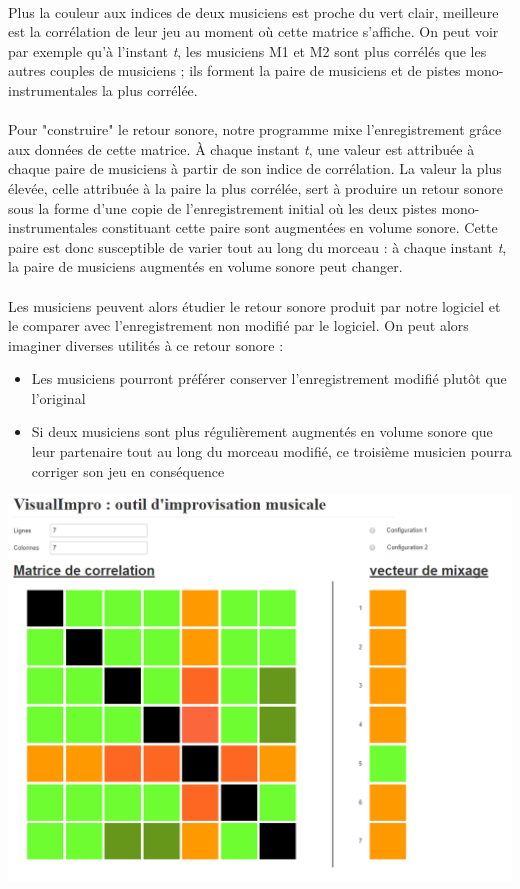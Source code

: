 \documentclass{article}
\begin{document}
\paragraph{}
Plus la couleur aux indices de deux musiciens est proche du vert clair,
meilleure est la corrélation de leur jeu au moment où cette matrice s'affiche.
On peut voir par exemple qu'à l'instant \textit{t}, les musiciens M1 et M2
sont plus corrélés que les autres couples de musiciens ; ils forment la paire
de musiciens et de pistes mono-instrumentales la plus corrélée.
\paragraph{}
Pour "construire" le retour sonore, notre programme mixe l'enregistrement
grâce aux données de cette matrice. À chaque instant \textit{t}, une valeur
est attribuée à chaque paire de musiciens à partir de son indice de
corrélation. La valeur la plus élevée, celle attribuée à la paire la plus
corrélée, sert à produire un retour sonore sous la forme d'une copie de
l'enregistrement initial où les deux pistes mono-instrumentales constituant
cette paire sont augmentées en volume sonore. Cette paire est donc susceptible
de varier tout au long du morceau : à chaque instant \textit{t}, la paire de
musiciens augmentés en volume sonore peut changer.
\paragraph{}
Les musiciens peuvent alors étudier le retour sonore produit par notre logiciel
et le comparer avec l'enregistrement non modifié par le logiciel. On peut
alors imaginer diverses utilités à ce retour sonore :
\begin{itemize}
	\item Les musiciens pourront préférer conserver l'enregistrement modifié plutôt
	      que l'original
	\item Si deux musiciens sont plus régulièrement augmentés en volume sonore que
	      leur partenaire tout au long du morceau modifié, ce troisième musicien pourra
	      corriger son jeu en conséquence
\end{itemize}


\centering
\includegraphics[scale=0.30]{proto_2.png}
\end{document}
